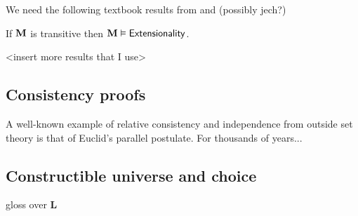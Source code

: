 We need the following textbook results from \autocite{kunen1980} and (possibly jech?)

\begin{lemma}
    If \(\mathbf{M}\) is transitive then \(\mathbf{M}\vDash{\normalfont\textsf{Extensionality}}\).
\end{lemma}

<insert more results that I use>

\subsection{Consistency proofs}

A well-known example of relative consistency and independence from outside set theory is that of Euclid's parallel postulate.
For thousands of years...

\subsection{Constructible universe and choice}
\label{subsection:constructible}

gloss over \(\mathbf{L}\)
